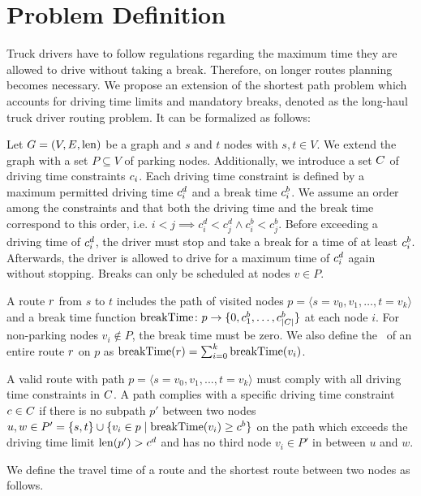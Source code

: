 \chapter{Problem Definition}\label{ch:problem_definitions}
Truck drivers have to follow regulations regarding the maximum time they are allowed to drive without taking a break. Therefore, on longer routes planning becomes necessary. We propose an extension of the shortest path problem which accounts for driving time limits and mandatory breaks, denoted as the long-haul truck driver routing problem. It can be formalized as follows:

Let $G=(V,E,\operatorname{len})$ be a graph and $s$ and $t$ nodes with $s,t \in V$. We extend the graph with a set $P \subseteq V$ of parking nodes. Additionally, we introduce a set $C$ of driving time constraints $c_i$. Each driving time constraint is defined by a maximum permitted driving time $c_i^d$ and a break time $c_i^b$. We assume an order among the constraints and that both the driving time and the break time correspond to this order, i.e. $i<j \implies c_i^d < c_j^d \wedge c_i^b < c_j^b$. Before exceeding a driving time of $c_i^d$, the driver must stop and take a break for a time of at least $c_i^b$. Afterwards, the driver is allowed to drive for a maximum time of $c_i^d$ again without stopping. Breaks can only be scheduled at nodes $v \in P$.

A route $r$ from $s$ to $t$ includes the path of visited nodes $p = \langle s=v_0,v_1,\dots,t=v_k \rangle$ and a break time function $\operatorname{breakTime}\colon p \rightarrow \{0,c_1^b,\dots,c_{|C|}^b\}$ at each node $i$. For non-parking nodes $v_i \notin P$, the break time must be zero. We also define the \breakTime\ of an entire route $r$ on $p$ as $\operatorname{breakTime}(r) = \sum_{i=0}^{k}{\operatorname{breakTime}(v_i)}$.

\begin{definition}
	A valid route with path $p = \langle s=v_0,v_1,...,t=v_k \rangle$ must comply with all driving time constraints in $C$. A path complies with a specific driving time constraint $c \in C$ if there is no subpath $p'$ between two nodes $u,w \in P' = \{s,t\} \cup \{v_i \in p \mid \operatorname{breakTime}(v_i) \ge c^b\}$ on the path which exceeds the driving time limit $\operatorname{len}(p') > c^d$ and has no third node $v_i \in P'$ in between $u$ and $w$.
\end{definition}

We define the travel time of a route and the shortest route between two nodes as follows.

